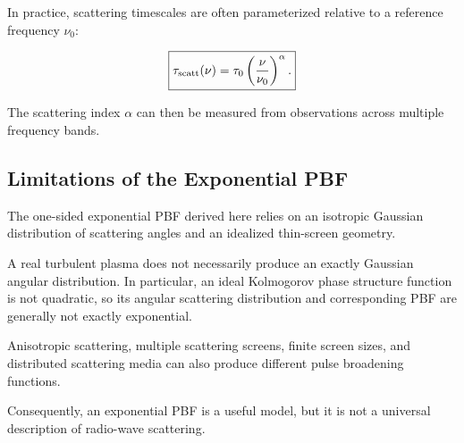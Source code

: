 In practice, scattering timescales are often
parameterized relative to a reference frequency
$\nu_0$:

\begin{equation}
\boxed{
\tau_{\rm scatt}(\nu)
=
\tau_0
\left(\frac{\nu}{\nu_0}\right)^\alpha.
}
\end{equation}

The scattering index $\alpha$ can then be measured
from observations across multiple frequency bands.

\subsection{Limitations of the Exponential PBF}

The one-sided exponential PBF derived here relies on
an isotropic Gaussian distribution of scattering angles
and an idealized thin-screen geometry.

A real turbulent plasma does not necessarily produce
an exactly Gaussian angular distribution. In particular,
an ideal Kolmogorov phase structure function is not
quadratic, so its angular scattering distribution and
corresponding PBF are generally not exactly exponential.

Anisotropic scattering, multiple scattering screens,
finite screen sizes, and distributed scattering media
can also produce different pulse broadening functions.

Consequently, an exponential PBF is a useful model,
but it is not a universal description of radio-wave
scattering.
